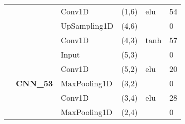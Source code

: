 \begin{table}[H]
\begin{center}
\begin{tabular}{ll|l|l|l|l|}
\multicolumn{1}{|l|}{}                                                                  &                                   & Conv1D                             & (1,6)                                & elu                                     & 54                                          \\ \cline{3-6} 
\multicolumn{1}{|l|}{}                                                                  &                                   & UpSampling1D                       & (4,6)                                &                                          & 0                                           \\ \cline{3-6} 
\multicolumn{1}{|l|}{}                                                                  &                                   & Conv1D                             & (4,3)                                & tanh                                     & 57                                          \\ \cline{2-6} 
\multicolumn{1}{|l|}{}                                                                  & \multirow{8}{*}{\textbf{CNN\_53}} & Input                              & (5,3)                                &                                          & 0                                           \\ \cline{3-6} 
\multicolumn{1}{|l|}{}                                                                  &                                   & Conv1D                             & (5,2)                                & elu                                     & 20                                          \\ \cline{3-6} 
\multicolumn{1}{|l|}{}                                                                  &                                   & MaxPooling1D                       & (3,2)                                &                                          & 0                                           \\ \cline{3-6} 
\multicolumn{1}{|l|}{}                                                                  &                                   & Conv1D                             & (3,4)                                & elu                                     & 28                                          \\ \cline{3-6} 
\multicolumn{1}{|l|}{}                                                                  &                                   & MaxPooling1D                       & (2,4)                                &                                          & 0                                           \\ \cline{3-6} 

\end{tabular}
\end{center}
\end{table}
